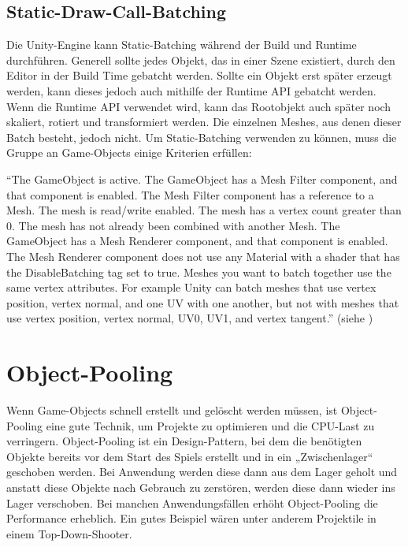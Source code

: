 \subsection{Static-Draw-Call-Batching}
Die Unity-Engine kann Static-Batching während der Build und Runtime durchführen. Generell sollte jedes Objekt, das in einer Szene existiert, durch den Editor in der Build Time gebatcht werden. Sollte ein Objekt erst später erzeugt werden, kann dieses jedoch auch mithilfe der Runtime API gebatcht werden. Wenn die Runtime API verwendet wird, kann das Rootobjekt auch später noch skaliert, rotiert und transformiert werden. Die einzelnen Meshes, aus denen dieser Batch besteht, jedoch nicht. Um Static-Batching verwenden zu können, muss die Gruppe an Game-Objects einige Kriterien erfüllen:
\cite{_drawcallbatching}

"`The GameObject is active.
The GameObject has a Mesh Filter
component, and that component is enabled.
The Mesh Filter component has a reference to a Mesh.
The mesh is read/write enabled.
The mesh has a vertex count greater than 0.
The mesh has not already been combined with another Mesh.
The GameObject has a Mesh Renderer
component, and that component is enabled.
The Mesh Renderer component does not use any Material with a shader
that has the DisableBatching tag set to true.
Meshes you want to batch together use the same vertex attributes. For example Unity can batch meshes that use vertex position, vertex normal, and one UV with one another, but not with meshes that use vertex position, vertex normal, UV0, UV1, and vertex tangent."'
(siehe \cite{_drawcallbatching})


\section{Object-Pooling}
Wenn Game-Objects schnell erstellt und gelöscht werden müssen, ist Object-Pooling eine gute Technik, um Projekte zu optimieren und die CPU-Last zu verringern. Object-Pooling ist ein Design-Pattern, bei dem die benötigten Objekte bereits vor dem Start des Spiels erstellt und in ein „Zwischenlager“ geschoben werden. Bei Anwendung werden diese dann aus dem Lager geholt und anstatt diese Objekte nach Gebrauch zu zerstören, werden diese dann wieder ins Lager verschoben. Bei manchen Anwendungsfällen erhöht Object-Pooling die Performance erheblich. Ein gutes Beispiel wären unter anderem Projektile in einem Top-Down-Shooter.
\cite{_objectpooling}

